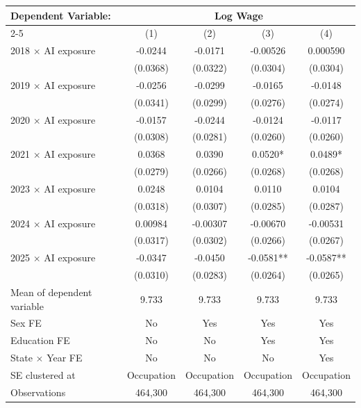 \def\sym#1{\ifmmode^{#1}\else\(^{#1}\)\fi}
\begin{tabular}{l*{4}{c}}
\toprule
Dependent Variable: & \multicolumn{4}{c}{Log Wage} \\
\cmidrule(lr){2-5}
 & (1) & (2) & (3) & (4) \\
\midrule
2018 $\times$ AI exposure&     -0.0244   &     -0.0171   &    -0.00526   &    0.000590   \\
            &    (0.0368)   &    (0.0322)   &    (0.0304)   &    (0.0304)   \\
2019 $\times$ AI exposure&     -0.0256   &     -0.0299   &     -0.0165   &     -0.0148   \\
            &    (0.0341)   &    (0.0299)   &    (0.0276)   &    (0.0274)   \\
2020 $\times$ AI exposure&     -0.0157   &     -0.0244   &     -0.0124   &     -0.0117   \\
            &    (0.0308)   &    (0.0281)   &    (0.0260)   &    (0.0260)   \\
2021 $\times$ AI exposure&      0.0368   &      0.0390   &      0.0520*  &      0.0489*  \\
            &    (0.0279)   &    (0.0266)   &    (0.0268)   &    (0.0268)   \\
2023 $\times$ AI exposure&      0.0248   &      0.0104   &      0.0110   &      0.0104   \\
            &    (0.0318)   &    (0.0307)   &    (0.0285)   &    (0.0287)   \\
2024 $\times$ AI exposure&     0.00984   &    -0.00307   &    -0.00670   &    -0.00531   \\
            &    (0.0317)   &    (0.0302)   &    (0.0266)   &    (0.0267)   \\
2025 $\times$ AI exposure&     -0.0347   &     -0.0450   &     -0.0581** &     -0.0587** \\
            &    (0.0310)   &    (0.0283)   &    (0.0264)   &    (0.0265)   \\
\midrule
Mean of dependent variable&       9.733   &       9.733   &       9.733   &       9.733   \\
Sex FE      &          No   &         Yes   &         Yes   &         Yes   \\
Education FE&          No   &          No   &         Yes   &         Yes   \\
State $\times$ Year FE&          No   &          No   &          No   &         Yes   \\
SE clustered at&  Occupation   &  Occupation   &  Occupation   &  Occupation   \\
Observations&     464,300   &     464,300   &     464,300   &     464,300   \\
\bottomrule
\end{tabular}
